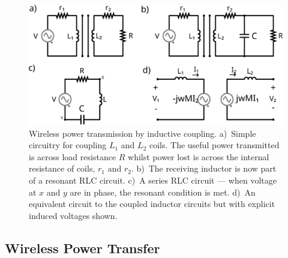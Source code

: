 \documentclass[11pt]{iopart}
\begin{document}
\begin{figure}
  \begin{center}
   \noindent\includegraphics[width=0.65\linewidth]{images/WPT.pdf}
  \end{center}
  \caption{Wireless power transmission by inductive
    coupling. a)~Simple circuitry for coupling $L_1$ and $L_2$
    coils. The useful power transmitted is across load resistance $R$
    whilst power lost is across the internal resistance of coils, $r_1$ and
    $r_2$. b)~The receiving inductor is now part of a resonant RLC
    circuit. c)~A series RLC circuit --- when voltage at $x$ and $y$
    are in phase, the resonant condition is met. d)~An equivalent
    circuit to the coupled inductor circuits but with explicit induced
    voltages shown. }\label{fig:WPT}
  \vspace{-0.7em}
\end{figure}


\subsection{Wireless Power Transfer}
\end{document}
